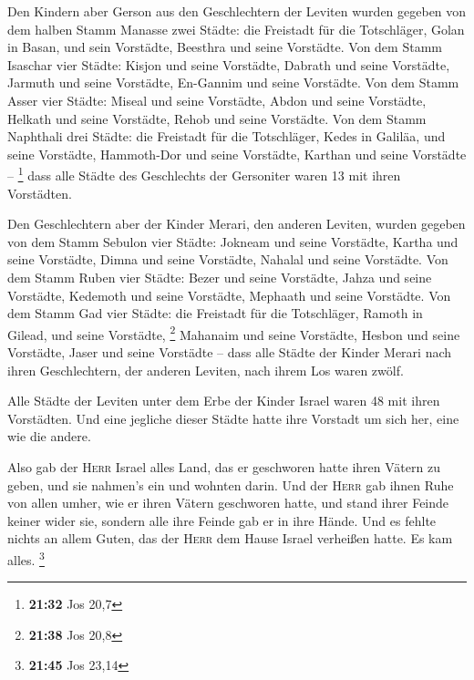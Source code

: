  Den Kindern aber Gerson aus den Geschlechtern der
Leviten wurden gegeben von dem halben Stamm Manasse zwei Städte: die
Freistadt für die Totschläger, Golan in Basan, und sein Vorstädte,
Beesthra und seine Vorstädte.  Von dem Stamm Isaschar
vier Städte: Kisjon und seine Vorstädte, Dabrath und seine Vorstädte,
 Jarmuth und seine Vorstädte, En-Gannim und seine
Vorstädte.  Von dem Stamm Asser vier Städte: Miseal und
seine Vorstädte, Abdon und seine Vorstädte,  Helkath und
seine Vorstädte, Rehob und seine Vorstädte.  Von dem
Stamm Naphthali drei Städte: die Freistadt für die Totschläger, Kedes in
Galiläa, und seine Vorstädte, Hammoth-Dor und seine Vorstädte, Karthan
und seine Vorstädte -- \footnote{\textbf{21:32} Jos 20,7}
 dass alle Städte des Geschlechts der Gersoniter waren 13
mit ihren Vorstädten.

 Den Geschlechtern aber der Kinder Merari, den anderen
Leviten, wurden gegeben von dem Stamm Sebulon vier Städte: Jokneam und
seine Vorstädte, Kartha und seine Vorstädte,  Dimna und
seine Vorstädte, Nahalal und seine Vorstädte.  Von dem
Stamm Ruben vier Städte: Bezer und seine Vorstädte, Jahza und seine
Vorstädte,  Kedemoth und seine Vorstädte, Mephaath und
seine Vorstädte.  Von dem Stamm Gad vier Städte: die
Freistadt für die Totschläger, Ramoth in Gilead, und seine Vorstädte,
\footnote{\textbf{21:38} Jos 20,8}  Mahanaim und seine
Vorstädte, Hesbon und seine Vorstädte, Jaser und seine Vorstädte --
 dass alle Städte der Kinder Merari nach ihren
Geschlechtern, der anderen Leviten, nach ihrem Los waren zwölf.

 Alle Städte der Leviten unter dem Erbe der Kinder Israel
waren 48 mit ihren Vorstädten.  Und eine jegliche dieser
Städte hatte ihre Vorstadt um sich her, eine wie die andere.

 Also gab der \textsc{Herr} Israel alles Land, das er
geschworen hatte ihren Vätern zu geben, und sie nahmen's ein und wohnten
darin.  Und der \textsc{Herr} gab ihnen Ruhe von allen
umher, wie er ihren Vätern geschworen hatte, und stand ihrer Feinde
keiner wider sie, sondern alle ihre Feinde gab er in ihre Hände.
 Und es fehlte nichts an allem Guten, das der
\textsc{Herr} dem Hause Israel verheißen hatte. Es kam alles.
\footnote{\textbf{21:45} Jos 23,14}

